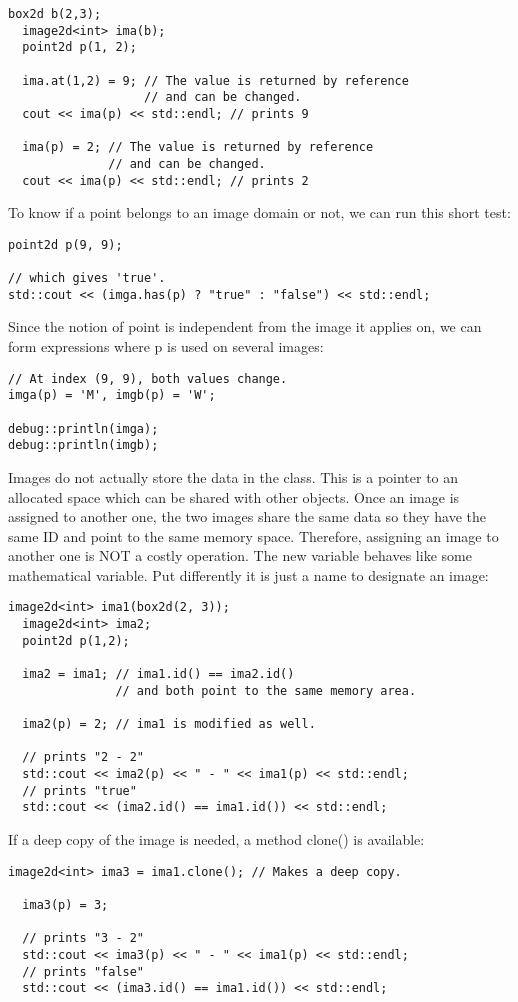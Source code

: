\documentclass{report}
\begin{document}
\begin{lstlisting}[frame=single]
  box2d b(2,3);
  image2d<int> ima(b);
  point2d p(1, 2);

  ima.at(1,2) = 9; // The value is returned by reference
                   // and can be changed.
  cout << ima(p) << std::endl; // prints 9

  ima(p) = 2; // The value is returned by reference
              // and can be changed.
  cout << ima(p) << std::endl; // prints 2
\end{lstlisting}


To know if a point belongs to an image domain or not, we can run this short
test:
\begin{lstlisting}[frame=single]
point2d p(9, 9);

// which gives 'true'.
std::cout << (imga.has(p) ? "true" : "false") << std::endl;
\end{lstlisting}

Since the notion of point is independent from the image it applies on, we can
form expressions where p is used on several images:
\begin{lstlisting}[frame=single]
// At index (9, 9), both values change.
imga(p) = 'M', imgb(p) = 'W';

debug::println(imga);
debug::println(imgb);
\end{lstlisting}


Images do not actually store the data in the class. This is a pointer
to an allocated space which can be shared with other objects. Once an image is
assigned to another one, the two images share the same data so they have the
same ID and point to the same memory space.
Therefore, assigning an image to another one is NOT a costly operation. The new
variable behaves like some mathematical variable.  Put differently it is just a
name to designate an image:
\begin{lstlisting}[frame=single]
  image2d<int> ima1(box2d(2, 3));
  image2d<int> ima2;
  point2d p(1,2);

  ima2 = ima1; // ima1.id() == ima2.id()
               // and both point to the same memory area.

  ima2(p) = 2; // ima1 is modified as well.

  // prints "2 - 2"
  std::cout << ima2(p) << " - " << ima1(p) << std::endl;
  // prints "true"
  std::cout << (ima2.id() == ima1.id()) << std::endl;
\end{lstlisting}

If a deep copy of the image is needed, a method clone() is available:
\begin{lstlisting}[frame=single]
  image2d<int> ima3 = ima1.clone(); // Makes a deep copy.

  ima3(p) = 3;

  // prints "3 - 2"
  std::cout << ima3(p) << " - " << ima1(p) << std::endl;
  // prints "false"
  std::cout << (ima3.id() == ima1.id()) << std::endl;
\end{lstlisting}
\end{document}

